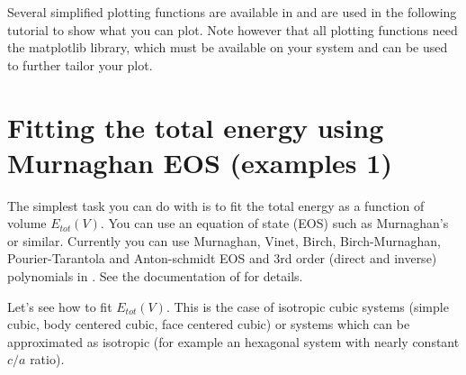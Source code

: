 \documentclass[letterpaper,10pt,english]{sphinxmanual}
\begin{document}
Several simplified plotting functions are available in  and are used in the following tutorial to show what you can plot.
Note however that all plotting functions need the matplotlib library, which must be available on your system and can be used to further tailor your plot.


\section{Fitting the total energy using Murnaghan EOS (examples 1)}
\label{tutorial:fitting-the-total-energy-using-murnaghan-eos-examples-1}
The simplest task you can do with  is to fit the total energy as a function of volume \(E_{tot}(V)\). You can use
an equation of state (EOS) such as Murnaghan's or similar.  Currently you can use Murnaghan, Vinet, Birch, Birch-Murnaghan, Pourier-Tarantola and Anton-schmidt EOS and 3rd order (direct and inverse) polynomials in . See the documentation of  for details.

Let's see how to fit \(E_{tot}(V)\). This is the case of isotropic cubic systems (simple cubic, body centered cubic, face centered cubic) or systems which can be approximated as isotropic (for example an hexagonal system with nearly constant \(c/a\) ratio).
\end{document}
